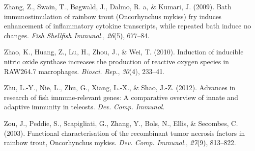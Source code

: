 \documentclass[12pt,a4paper,]{article}
\begin{document}
Zhang, Z., Swain, T., Bøgwald, J., Dalmo, R. a, \& Kumari, J. (2009).
Bath immunostimulation of rainbow trout (Oncorhynchus mykiss) fry
induces enhancement of inflammatory cytokine transcripts, while repeated
bath induce no changes. \emph{Fish Shellfish Immunol.}, \emph{26}(5),
677--84.

Zhao, K., Huang, Z., Lu, H., Zhou, J., \& Wei, T. (2010). Induction of
inducible nitric oxide synthase increases the production of reactive
oxygen species in RAW264.7 macrophages. \emph{Biosci. Rep.},
\emph{30}(4), 233--41.

Zhu, L.-Y., Nie, L., Zhu, G., Xiang, L.-X., \& Shao, J.-Z. (2012).
Advances in research of fish immune-relevant genes: A comparative
overview of innate and adaptive immunity in teleosts. \emph{Dev. Comp.
Immunol.}

Zou, J., Peddie, S., Scapigliati, G., Zhang, Y., Bols, N., Ellis, \&
Secombes, C. (2003). Functional characterisation of the recombinant
tumor necrosis factors in rainbow trout, Oncorhynchus mykiss. \emph{Dev.
Comp. Immunol.}, \emph{27}(9), 813--822.
\end{document}
